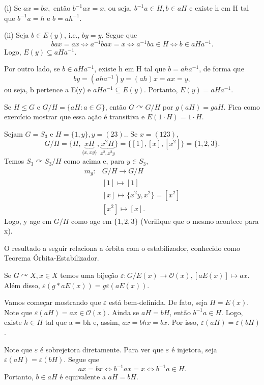 \documentclass[algebra_notes.tex]{subfiles}
\begin{document}
\begin{proof*}
	(i) Se \(ax = bx,\) então \(b^{-1}ax = x\), ou seja, \(b^{-1}a\in H, b\in aH\) e existe h em H tal que \(b^{-1}a = h\) e \(b = ah^{-1}\).

	(ii) Seja \(b\in E(y)\), i.e., \(by=y.\) Segue que
	\[
		bax = ax \Longleftrightarrow a^{-1}bax = x \Longleftrightarrow a^{-1}ba\in H \Longleftrightarrow b\in aHa^{-1}.
	\]
	Logo, \(E(y)\subseteq{aHa^{-1}}\).

	Por outro lado, se \(b\in aHa^{-1}\), existe h em H tal que \(b = aha^{-1}\), de forma que
	\[
		by = (aha^{-1})y = (ah)x = ax = y,
	\]
	ou seja, b pertence a E(y) e \(aHa^{-1}\subseteq{E(y)}\). Portanto, \(E(y) = aHa^{-1}.\) \qedsymbol
\end{proof*}
\begin{example*}
	Se \(H\leq G\) e \(G/H = \{aH: a \in G\}\), então \(G \curvearrowright  G/H\) por \(g(aH) = gaH.\) Fica como exercício mostrar que essa ação
	é transitiva e \(E(1 \cdot H) = 1 \cdot H\).
\end{example*}
\begin{example*}
	Sejam \(G = S_{3}\) e \(H = \{1, y\}, y = (23).\). Se \(x=(123)\),
	\[
		G/H = \{H, \underbrace{xH}_{\{x, xy\}}, \underbrace{x^{2}H}_{x^{2}, x^{2}y}\} = \{[1], [x], [x^{2}]\} = \{\overline{1}, \overline{2}, \overline{3}\}.
	\]
	Temos \(S_{3} \curvearrowright S_{3}/H\) como acima e, para \(y\in S_{3}\),
	\begin{align*}
		m_{g}: & G/H\rightarrow G/H                    \\
		       & [1]\mapsto[1]                         \\
		       & [x]\mapsto\{x^{2}y, x^{2}\} = [x^{2}] \\
		       & [x^{2}]\mapsto[x].
	\end{align*}
	Logo, y age em \(G/H\) como age em \(\{1, 2, 3\}\) (Verifique que o mesmo acontece para x).
\end{example*}
O resultado a seguir relaciona a órbita com o estabilizador, conhecido como Teorema Órbita-Estabilizador.
\hypertarget{orbit_stabilizer}{
	\begin{theorem*}
		Se \(G \curvearrowright X, x\in X\) temos uma bijeção \(\varepsilon :G/E(x)\rightarrow \mathcal{O}(x), [aE(x)]\mapsto ax\). Além disso,
		\(\varepsilon (g*aE(x)) = g\varepsilon (aE(x))\).
	\end{theorem*}
}
\begin{proof*}
	Vamos começar mostrando que \(\varepsilon \) está bem-definida. De fato, seja \(H = E(x)\). Note que \(\varepsilon (aH) = ax\in \mathcal{O}(x)\).
	Ainda se \(aH = bH\), então \(b^{-1}a\in H.\) Logo, existe \(h\in H\) tal que a = bh e, assim, \(ax = bhx = bx.\) Por isso, \(\varepsilon (aH) = \varepsilon (bH)\).

	Note que \(\varepsilon  \) é sobrejetora diretamente. Para ver que \(\varepsilon \) é injetora, seja \(\varepsilon (aH) = \varepsilon (bH)\). Segue que
	\[
		ax = bx \Longleftrightarrow b^{-1}ax = x \Longleftrightarrow b^{-1}a\in H.
	\]
	Portanto, \(b\in aH\) é equivalente a \(aH = bH\). \qedsymbol
\end{proof*}
\end{document}
